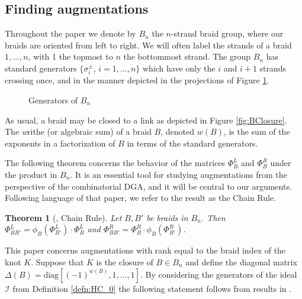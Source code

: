 \documentclass[11pt]{amsart}
\newtheorem{thm}{Theorem}[section]
\begin{document}
\subsection{Finding augmentations}
\label{SecBG_AugExist}
  Throughout the paper we denote by $B_n$ the $n$-strand braid group, where our braids are oriented from left to right. We will often label the strands of a braid $1,\ldots, n$, with 1 the topmost to $n$ the bottommost strand. The group $B_n$ has standard generators $\{\sigma_i^{\pm}$, $i=1,\ldots,n\}$ which have only the $i$ and $i+1$ strands crossing once, and in the manner depicted in the projections of Figure \ref{fig:BraidGens}.
    \begin{figure}[ht]
      \caption{Generators of $B_n$}
      \label{fig:BraidGens}
    \end{figure}
  As usual, a braid may be closed to a link as depicted in Figure \ref{fig:BClosure}. The {\emph writhe} (or algebraic sum) of a braid $B$, denoted $w(B)$, is the sum of the exponents in a factorization of $B$ in terms of the standard generators.

  The following theorem concerns the behavior of the matrices $\Phi_B^L$ and $\Phi_B^R$ under the product in $B_n$. It is an essential tool for studying augmentations from the perspective of the combinatorial DGA, and it will be central to our arguments. Following language of that paper, we refer to the result as the Chain Rule.

  \begin{thm}[\cite{Ng05}, Chain Rule] Let $B,B'$ be braids in $B_n$. Then $\Phi_{BB'}^L = \phi_B(\Phi_{B'}^L)\cdot\Phi_B^L$ and $\Phi_{BB'}^R = \Phi_B^R\cdot\phi_B(\Phi_{B'}^R)$.
  \label{thm:ChainRule}
  \end{thm}

  This paper concerns augmentations with rank equal to the braid index of the knot $K$. Suppose that $K$ is the closure of $B\in B_n$ and define the diagonal matrix $\Delta(B)=\text{diag}[(-1)^{w(B)},1,\ldots,1]$. By considering the generators of the ideal $\mathcal I$ from Definition \ref{defn:HC_0} the following statement follows from results in \cite[Section 5]{Cor13b}.
\end{document}
